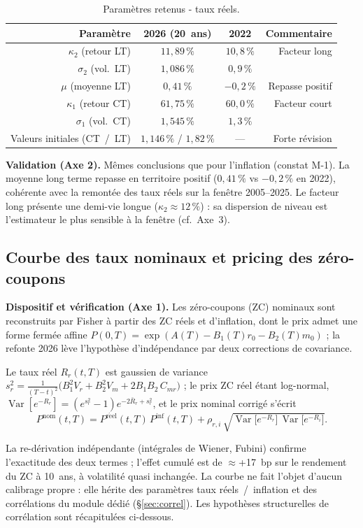 \documentclass[11pt,a4paper]{article}
\renewcommand{\arraystretch}{1.4}
\newcommand{\tablehead}[1]{\textcolor{nxnavy}{\sffamily\bfseries\small #1}}
\begin{document}
\begin{table}[H]
\centering\small
\renewcommand{\arraystretch}{1.4}\setlength{\tabcolsep}{6pt}
\begin{tabularx}{\linewidth}{R C C R}
\toprule
\tablehead{Paramètre} & \tablehead{2026 (20~ans)} & \tablehead{2022} & \tablehead{Commentaire} \\
\midrule
{} $\kappa_2$ (retour LT) & $11{,}89\,\%$ & $10{,}8\,\%$ & Facteur long \\
$\sigma_2$ (vol.\ LT) & $1{,}086\,\%$ & $0{,}9\,\%$ & \\
 $\mu$ (moyenne LT) & $0{,}41\,\%$ & $-0{,}2\,\%$ & Repasse positif \\
$\kappa_1$ (retour CT) & $61{,}75\,\%$ & $60{,}0\,\%$ & Facteur court \\
 $\sigma_1$ (vol.\ CT) & $1{,}545\,\%$ & $1{,}3\,\%$ & \\
Valeurs initiales (CT~/~LT) & $1{,}146\,\%$ / $1{,}82\,\%$ & --- & Forte révision \\
\bottomrule
\end{tabularx}
\caption{Paramètres retenus - taux réels.}
\end{table}

\textbf{Validation (Axe 2).} Mêmes conclusions que pour l'inflation (constat M-1). La moyenne long terme repasse en territoire positif ($0{,}41\,\%$ vs $-0{,}2\,\%$ en 2022), cohérente avec la remontée des taux réels sur la fenêtre 2005--2025. Le facteur long présente une demi-vie longue ($\kappa_2\approx12\,\%$) : sa dispersion de niveau est l'estimateur le plus sensible à la fenêtre (cf.\ Axe~3).

\subsection{Courbe des taux nominaux et pricing des zéro-coupons}
\label{sec:zc-corr}

\textbf{Dispositif et vérification (Axe 1).} Les zéro-coupons (ZC) nominaux sont reconstruits par Fisher à partir des ZC réels et d'inflation, dont le prix admet une forme fermée affine $P(0,T)=\exp(A(T)-B_1(T)r_0-B_2(T)m_0)$ ; la refonte 2026 lève l'hypothèse d'indépendance par deux corrections de covariance.
\begin{definitionbox}
Le taux réel $R_r(t,T)$ est gaussien de variance $s_r^2=\tfrac{1}{(T-t)^2}\big(B_1^2 V_r+B_2^2 V_m+2 B_1 B_2\,C_{mr}\big)$ ; le prix ZC réel étant log-normal, $\operatorname{Var}[e^{-R_r}]=(e^{s_r^2}-1)e^{-2\bar R_r+s_r^2}$, et le prix nominal corrigé s'écrit
\[
P^{\mathrm{nom}}(t,T)=P^{\mathrm{r\acute eel}}(t,T)\,P^{\mathrm{inf}}(t,T)+\rho_{r,i}\,\sqrt{\operatorname{Var}\!\big[e^{-R_r}\big]\,\operatorname{Var}\!\big[e^{-R_i}\big]}.
\]
\end{definitionbox}
La re-dérivation indépendante (intégrales de Wiener, Fubini) confirme l'exactitude des deux termes ; l'effet cumulé est de $\approx$+17~bp sur le rendement du ZC à 10~ans, à volatilité quasi inchangée. La courbe ne fait l'objet d'aucun calibrage propre : elle hérite des paramètres taux réels~/~inflation et des corrélations du module dédié (\S\ref{sec:correl}). Les hypothèses structurelles de corrélation sont récapitulées ci-dessous.
\end{document}

